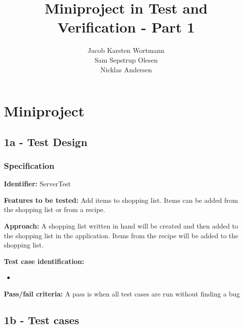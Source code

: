 \documentclass[a4paper,12pt]{memoir}
\title{Miniproject in Test and Verification - Part 1}
\author{Jacob Karsten Wortmann\\Sam Sepstrup Olesen\\Nicklas Andersen}
\newcommand{\testdesign}[5]
{
\begin{framed}
\begin{description}
\item \textbf{Identifier:} #1
\item \textbf{Features to be tested:} #2
\item \textbf{Approach:} #3
\item \textbf{Test case identification:} #4
\item \textbf{Pass/fail criteria:} #5
\end{description}
\end{framed}
}
\begin{document}
\maketitle
\chapter*{Miniproject}
\section*{1a - Test Design}
\subsection*{Specification}
\testdesign
{ServerTest}
{Add items to shopping list. Items can be added from the shopping list or from a recipe.}
{A shopping list written in hand will be created and then added to the shopping list in the application. Items from the recipe will be added to the shopping list.}
{\begin{itemize}[nolistsep]
\item 
\end{itemize}}
{A pass is when all test cases are run without finding a bug}

\section*{1b - Test cases}
\end{document}

